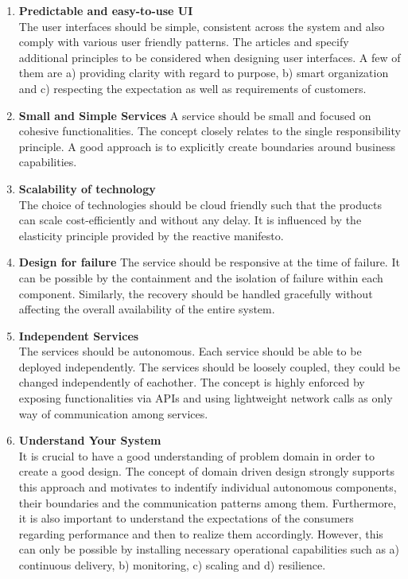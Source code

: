 \begin{enumerate}
\item \textbf{Predictable and easy-to-use UI}\\
The user interfaces should be simple, consistent across the system and also comply with various user friendly patterns.\cite{Sollenberger:2012aa} The articles \cite{Martin:2013aa} and \cite{Porter:2016aa} specify additional principles to be considered when designing user interfaces. A few of them are a) providing clarity with regard to purpose, b) smart organization and c) respecting the expectation as well as requirements of customers.
\item \textbf{Small and Simple Services}
A service should be small and focused on cohesive functionalities. The concept closely relates to the single responsibility principle. \cite{Martin:2016aa} A good approach is to explicitly create boundaries around business capabilities.\cite{Newman:2015aa}
\item \textbf{Scalability of technology}\\
The choice of technologies should be cloud friendly such that the products can scale cost-efficiently and without any delay. It is influenced by the elasticity principle provided by the reactive manifesto.\cite{Boner:2014aa}
\item \textbf{Design for failure}
The service should be responsive at the time of failure. It can be possible by the containment and the isolation of failure within each component. Similarly, the recovery should be handled gracefully without affecting the overall availability of the entire system. \cite{Boner:2014aa}
\item \textbf{Independent Services}\\
The services should be autonomous. Each service should be able to be deployed independently. The services should be loosely coupled, they could be changed independently of eachother. The concept is highly enforced by exposing functionalities via \acrshort{API}s and using lightweight network calls as only way of communication among services. \cite{Newman:2015aa}
\item \textbf{Understand Your System}\\
It is crucial to have a good understanding of problem domain in order to create a good design. The concept of domain driven design strongly supports this approach and motivates to indentify individual autonomous components, their boundaries and the communication patterns among them. \cite{Newman:2015aa} Furthermore, it is also important to understand the expectations of the consumers regarding performance and then to realize them accordingly. However, this can only be possible by installing necessary operational capabilities such as a) continuous delivery, b) monitoring, c) scaling and d) resilience.
\end{enumerate}
